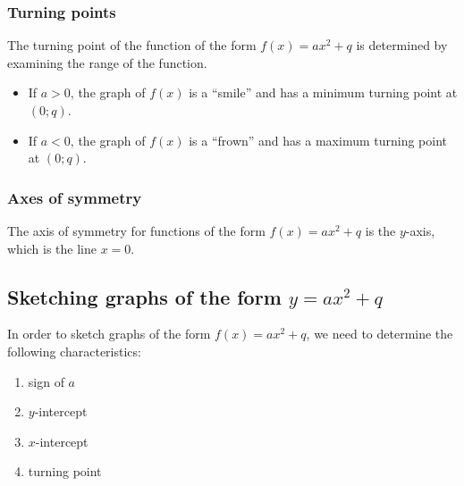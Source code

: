 \subsubsection*{Turning points}

The turning point of the function of the form $f(x)=ax^{2}+q$ is determined by examining the range of the function. 
\begin{itemize}
 \item If $a>0$, the graph of $f(x)$ is a ``smile'' and has a minimum turning point at $(0;q)$.
\item If $a<0$, the graph of $f(x)$ is a ``frown'' and has a maximum turning point at $(0;q)$.
\end{itemize}


\subsubsection*{Axes of symmetry}

The axis of symmetry for functions of the form $f(x)=ax^{2}+q$ is the $y$-axis, which is the line $x=0$. 

\subsection*{Sketching graphs of the form $y=ax^{2}+q$}

In order to sketch graphs of the form $f(x)=ax^{2}+q$, we need to determine the following characteristics:
\begin{enumerate}[noitemsep, label=\textbf{\arabic*}. ] 
\item sign of $a$
\item $y$-intercept
\item $x$-intercept
\item turning point

\end{enumerate}


